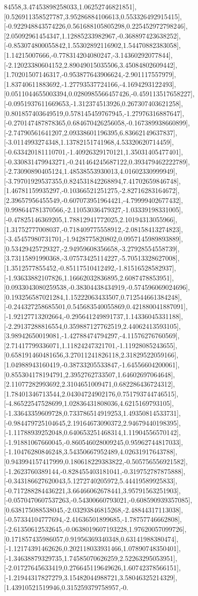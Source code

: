 \documentclass{article}
\begin{document}
84558,3.47453898258033,1.06252746821851],[0.526911358527787,3.95286884106613,0.553326492915415],[-0.922948843574226,0.561688105805298,0.225452972798246],[2.05092961454347,1.12885233982967,-0.368897423638252],[-0.853074800055842,1.55302892116902,1.54470882383058],[1.14215007666,-0.778314204080247,-3.14360292077844],[-2.12023380604152,2.89049015035506,3.45084802609442],[1.70201507146317,-0.953877643906624,-2.901117557979],[1.83740611883692,-1.27793537724166,-4.1694293122493],[0.0511044655003394,0.0280985566457426,-0.459113517658227],[-0.0951937611669653,-1.312374513926,0.267307403621258],[0.801857403649519,0.578145459767945,-1.27976316887647],[-0.270147487878365,0.684670426256058,-0.167389938660899],[-2.74790561641207,2.09338601196395,6.83662149637837],[-3.0114993274348,1.13782151741968,4.53320620714459],[-0.633420181110701,-1.40926329170121,1.35031405477401],[-0.330831479943271,-0.241464245687122,0.393479462222789],[-2.73090890405124,1.48538553930013,4.01602330999949],[-3.79701929537355,0.824531842268894,7.41702659846748],[1.46781159935297,-0.10366521251275,-2.82716283164672],[2.39657956455549,-0.607073951964421,-4.79999402677432],[0.998644781370566,-2.11053036479327,-1.03339198331005],[-0.47825146369205,1.78812941772025,2.10194313055966],[1.31752777008037,-0.718409775558912,-2.08158413274823],[-3.45457980731701,-1.9428775820802,0.0957145989893889],[0.53429425729327,-2.94959608356658,-3.27928554558739],[3.73115891990368,-3.07573425114227,-5.70513328627008],[1.3512577855452,-0.85117510412492,-1.81516528582937],[-1.93633882107826,1.16662032836895,2.6087478853951],[0.0933043080259538,-0.38304438434919,-0.574596069024696],[0.193256587021284,1.15222063433507,0.712544661384248],[-0.244327258685501,0.545683540055869,0.421880041887091],[-1.92127713202664,-0.295641249891737,1.14336045331188],[-2.29137288816554,0.359887127762519,2.44062413593105],[3.98942650019081,-1.42788474794297,-4.11576276760569],[2.71417799336071,1.11824247321701,-1.11928085243655],[0.658191460481656,3.27011241826118,2.31829522059166],[1.04988943160419,-0.38733205533847,-1.64556604200061],[0.855304178194791,2.3952762733507,1.64602697064648],[2.11077282993692,2.3104651009471,0.682286436724312],[1.78401346713544,2.04304724902176,0.751793744746515],[-4.86522547528699,1.02836431808036,4.6215169793105],[-1.33643359609728,0.733786514919253,1.49350814533731],[-0.984479725104645,2.19164673090372,2.94679440198395],[-1.11788939252048,0.640653251468314,1.11904556570142],[-1.91881067660045,-0.860546028009245,0.95962744817033],[-1.10476280846248,3.54350667952489,4.02631917643788],[0.943994157417999,0.180618229383822,-0.505756556921582],[-1.2623760389144,-0.828455403181041,-0.319752787875888],[-0.343186627620043,5.1272740205972,5.44419589925833],[-0.717288284436221,3.66466062678441,3.95791563251903],[-0.0570470607537263,-0.54300660793021,-0.608590939357085],[0.638175088538045,-2.03293846815268,-2.48844317113038],[-0.57334104777694,-2.41636501899685,-1.78757746662808],[-2.61350612532645,-0.0638019607193228,1.97620057099726],[0.171857435986057,0.91956369340348,0.63141988380474],[-1.12174391462626,0.202118033931466,1.07890748350401],[-1.34638879329735,1.74585070626259,2.52263295053951],[-2.01727645633419,0.276645119649626,1.60742378566151],[-1.21944317827279,3.15482044988721,3.58046325214329],[1.43910521519946,0.315259379758957,-0.
\end{document}
